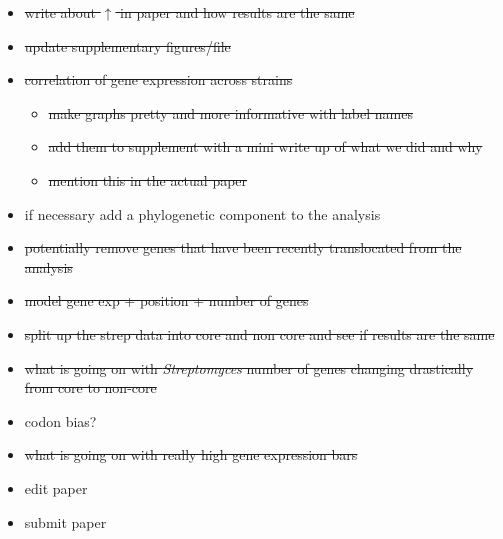 \documentclass[12pt]{article}
\newcommand{\strep}{\textit{Streptomyces}\xspace}
\begin{document}
\begin{itemize}
	\item \sout{write about $\uparrow$ in paper and how results are the same}
	
	\item \sout{update supplementary figures/file}
	
	\item \sout{correlation of gene expression across strains}
	\begin{itemize}
		\item \sout{make graphs pretty and more informative with label names}
		\item \sout{add them to supplement with a mini write up of what we did and why}
		\item \sout{mention this in the actual paper}
	\end{itemize}
	
	\item if necessary add a phylogenetic component to the analysis
	
	\item \sout{potentially remove genes that have been recently translocated from the analysis}
	
	\item \sout{model gene exp + position + number of genes}
	
	\item \sout{split up the strep data into core and non core and see if results are the same}
	
	\item \sout{what is going on with \strep number of genes changing drastically from core to non-core}
	
	\item codon bias?
	
	\item \sout{what is going on with really high gene expression bars}
	
	\item edit paper
	
	\item submit paper
	
\end{itemize}
\end{document}
